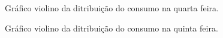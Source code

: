 \documentclass[	12pt, Times, openright, twoside, a4paper, english, brazil]{abntex2}
\begin{document}
                \begin{figure}[!ht]
                	\caption{Gráfico violino da ditribuição do consumo na quarta feira. \label{fig:case1_violinplot_quarta} }
                \end{figure}
                
                \begin{figure}[!ht]
                	\caption{Gráfico violino da ditribuição do consumo na quinta feira. \label{fig:case1_violinplot_quinta} }
                \end{figure}
                
\end{document}

